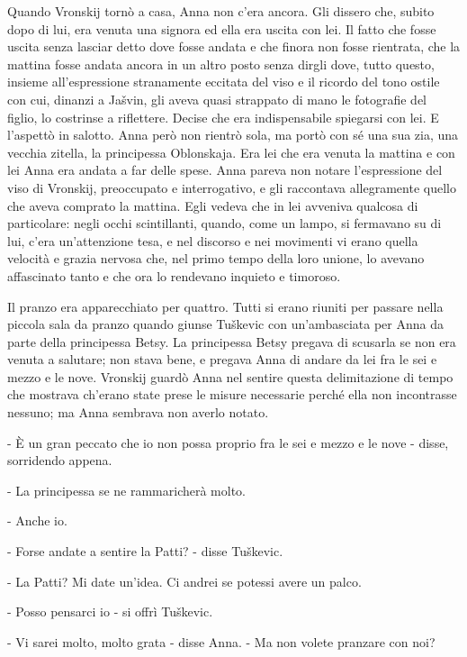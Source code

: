Quando Vronskij tornò a casa, Anna non c'era ancora. Gli dissero che, subito dopo di lui, era venuta una signora ed ella era uscita con lei. Il fatto che fosse uscita senza lasciar detto dove fosse andata e che finora non fosse rientrata, che la mattina fosse andata ancora in un altro posto senza dirgli dove, tutto questo, insieme all'espressione stranamente eccitata del viso e il ricordo del tono ostile con cui, dinanzi a Jašvin, gli aveva quasi strappato di mano le fotografie del figlio, lo costrinse a riflettere. Decise che era indispensabile spiegarsi con lei. E l'aspettò in salotto. Anna però non rientrò sola, ma portò con sé una sua zia, una vecchia zitella, la principessa Oblonskaja. Era lei che era venuta la mattina e con lei Anna era andata a far delle spese. Anna pareva non notare l'espressione del viso di Vronskij, preoccupato e interrogativo, e gli raccontava allegramente quello che aveva comprato la mattina. Egli vedeva che in lei avveniva qualcosa di particolare: negli occhi scintillanti, quando, come un lampo, si fermavano su di lui, c'era un'attenzione tesa, e nel discorso e nei movimenti vi erano quella velocità e grazia nervosa che, nel primo tempo della loro unione, lo avevano affascinato tanto e che ora lo rendevano inquieto e timoroso. 

Il pranzo era apparecchiato per quattro. Tutti si erano riuniti per passare nella piccola sala da pranzo quando giunse Tuškevic con un'ambasciata per Anna da parte della principessa Betsy. La principessa Betsy pregava di scusarla se non era venuta a salutare; non stava bene, e pregava Anna di andare da lei fra le sei e mezzo e le nove. Vronskij guardò Anna nel sentire questa delimitazione di tempo che mostrava ch'erano state prese le misure necessarie perché ella non incontrasse nessuno; ma Anna sembrava non averlo notato. 

- È un gran peccato che io non possa proprio fra le sei e mezzo e le nove - disse, sorridendo appena. 

- La principessa se ne rammaricherà molto. 

- Anche io. 

- Forse andate a sentire la Patti? - disse Tuškevic. 

- La Patti? Mi date un'idea. Ci andrei se potessi avere un palco. 

- Posso pensarci io - si offrì Tuškevic. 

- Vi sarei molto, molto grata - disse Anna. - Ma non volete pranzare con noi? 

